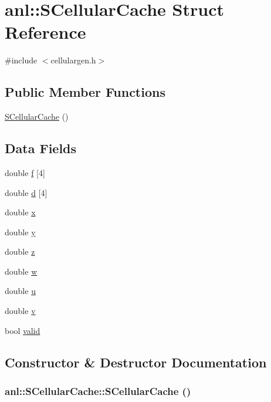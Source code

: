 \hypertarget{structanl_1_1SCellularCache}{
\section{anl::SCellularCache Struct Reference}
\label{structanl_1_1SCellularCache}
}


{\ttfamily \#include $<$cellulargen.h$>$}\subsection*{Public Member Functions}
\begin{DoxyCompactItemize}
\item 
\hyperlink{structanl_1_1SCellularCache_a3aac228c042c614db006f7d2336339ca}{SCellularCache} ()
\end{DoxyCompactItemize}
\subsection*{Data Fields}
\begin{DoxyCompactItemize}
\item 
double \hyperlink{structanl_1_1SCellularCache_ad93400f199663d6ea841b0ff000587c1}{f} \mbox{[}4\mbox{]}
\item 
double \hyperlink{structanl_1_1SCellularCache_a05bfad5cd549a2878834c71de43d5778}{d} \mbox{[}4\mbox{]}
\item 
double \hyperlink{structanl_1_1SCellularCache_a351e3016b04686dbaf81728ad020e546}{x}
\item 
double \hyperlink{structanl_1_1SCellularCache_a0f52fd8340bda1283fb659e0b6f57015}{y}
\item 
double \hyperlink{structanl_1_1SCellularCache_ac72c3ba75a1250ef5111f9af52edb194}{z}
\item 
double \hyperlink{structanl_1_1SCellularCache_a483f2f965a07ba52182183a6b5e5698b}{w}
\item 
double \hyperlink{structanl_1_1SCellularCache_ad8c76183680b909e2c6b509d7f67d1e7}{u}
\item 
double \hyperlink{structanl_1_1SCellularCache_a406836f25bfea007c3aebbea3645203a}{v}
\item 
bool \hyperlink{structanl_1_1SCellularCache_a49bc143bf599b60d212ab0bdc2a95f64}{valid}
\end{DoxyCompactItemize}


\subsection{Constructor \& Destructor Documentation}
\hypertarget{structanl_1_1SCellularCache_a3aac228c042c614db006f7d2336339ca}{
\subsubsection[{SCellularCache}]{\setlength{\rightskip}{0pt plus 5cm}anl::SCellularCache::SCellularCache ()}}
\label{structanl_1_1SCellularCache_a3aac228c042c614db006f7d2336339ca}


